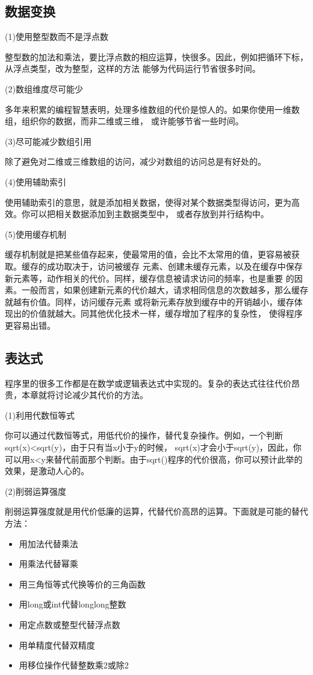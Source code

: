 \documentclass{article}
\begin{document}
\subsection{数据变换}
\par
(1)使用整型数而不是浮点数
\par
整型数的加法和乘法，要比浮点数的相应运算，快很多。因此，例如把循环下标，从浮点类型，改为整型，这样的方法
能够为代码运行节省很多时间。

\par
(2)数组维度尽可能少
\par
多年来积累的编程智慧表明，处理多维数组的代价是惊人的。如果你使用一维数组，组织你的数据，而非二维或三维，
或许能够节省一些时间。

\par
(3)尽可能减少数组引用
\par
除了避免对二维或三维数组的访问，减少对数组的访问总是有好处的。

\par
(4)使用辅助索引
\par
使用辅助索引的意思，就是添加相关数据，使得对某个数据类型得访问，更为高效。你可以把相关数据添加到主数据类型中，
或者存放到并行结构中。

\par
(5)使用缓存机制
\par
缓存机制就是把某些值存起来，使最常用的值，会比不太常用的值，更容易被获取。缓存的成功取决于，访问被缓存
元素、创建未缓存元素，以及在缓存中保存新元素等，动作相关的代价。同样，缓存信息被请求访问的频率，也是重要
的因素。一般而言，如果创建新元素的代价越大，请求相同信息的次数越多，那么缓存就越有价值。同样，访问缓存元素
或将新元素存放到缓存中的开销越小，缓存体现出的价值就越大。同其他优化技术一样，缓存增加了程序的复杂性，
使得程序更容易出错。

\subsection{表达式}
程序里的很多工作都是在数学或逻辑表达式中实现的。复杂的表达式往往代价昂贵，本章就将讨论减少其代价的方法。
\par
(1)利用代数恒等式
\par
你可以通过代数恒等式，用低代价的操作，替代复杂操作。例如，一个判断sqrt(x)<sqrt(y)，由于只有当x小于y的时候，
sqrt(x)才会小于sqrt(y)，因此，你可以用x<y来替代前面那个判断。由于sqrt()程序的代价很高，你可以预计此举的
效果，是激动人心的。

\par
(2)削弱运算强度
\par
削弱运算强度就是用代价低廉的运算，代替代价高昂的运算。下面就是可能的替代方法：
\begin{itemize}
    \item 用加法代替乘法
    \item 用乘法代替幂乘
    \item 用三角恒等式代换等价的三角函数
    \item 用long或int代替longlong整数
    \item 用定点数或整型代替浮点数
    \item 用单精度代替双精度
    \item 用移位操作代替整数乘2或除2
\end{itemize}
\end{document}
